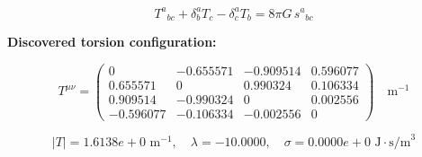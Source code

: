 
\begin{equation}
  T^a{}_{bc} + \delta^a_b T_c - \delta^a_c T_b = 8\pi G \, s^a{}_{bc}
\end{equation}

\textbf{Discovered torsion configuration:}

\begin{equation}
  T^{\mu\nu} = \begin{pmatrix}
    0 & -0.655571 & -0.909514 & 0.596077 \\
    0.655571 & 0 & 0.990324 & 0.106334 \\
    0.909514 & -0.990324 & 0 & 0.002556 \\
    -0.596077 & -0.106334 & -0.002556 & 0
  \end{pmatrix} \quad \text{m}^{-1}
\end{equation}

\begin{equation}
  |T| = 1.6138e+0 \text{ m}^{-1}, \quad
  \lambda = -10.0000, \quad
  \sigma = 0.0000e+0 \text{ J}\cdot\text{s/m}^3
\end{equation}